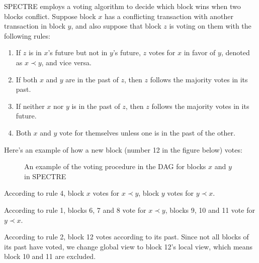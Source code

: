 \documentclass[a4paper,11pt]{article}
\begin{document}
SPECTRE employs a voting algorithm to decide which block wins when two blocks
conflict. Suppose block $x$ has a conflicting transaction with another
transaction in block $y$, and also suppose that block $z$ is voting on them with
the following rules:

\begin{enumerate}
	\item If $z$ is in $x$'s future but not in $y$'s future, $z$ votes for
		$x$ in favor of $y$, denoted as $x \prec y$, and vice versa.
	\item If both $x$ and $y$ are in the past of $z$, then $z$ follows the majority votes in its past.
	\item If neither $x$ nor $y$ is in the past of $z$, then $z$ follows the majority votes in its future.
	\item Both $x$ and $y$ vote for themselves unless one is in the past of
		the other.
\end{enumerate}


Here's an example of how a new block (number 12 in the figure below) votes:

\begin{figure}[ht]
	\centerline{%
	}
\caption{An example of the voting procedure in the DAG for blocks $x$ and $y$ in SPECTRE}
\end{figure}

According to rule 4, block $x$ votes for $x \prec y$, block $y$ votes for $y
\prec x$.

According to rule 1, blocks 6, 7 and 8 vote for $x \prec y$, blocks 9, 10 and 11
vote for $y \prec x$.

According to rule 2, block 12 votes according to its past. Since not all blocks
of its past have voted, we change global view to block 12's local view, which
means block 10 and 11 are excluded.
\end{document}
